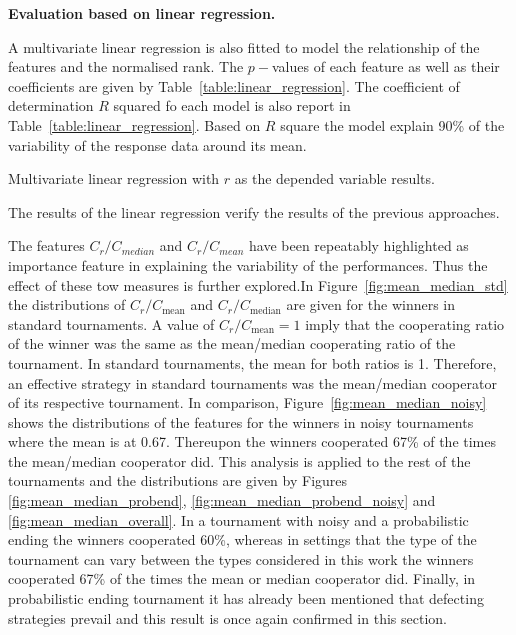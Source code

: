 \documentclass{article}
\begin{document}
\textbf{Evaluation based on linear regression.}

A multivariate linear regression is also fitted to model the relationship of the
features and the normalised rank. The \(p-\)values of each feature as well as
their coefficients are given by Table~\ref{table:linear_regression}. The
coefficient of determination \(R\) squared fo each model is also report in
Table~\ref{table:linear_regression}. Based on \(R\) square the model explain 90\% of
the variability of the response data around its mean.

\begin{table}[h]
    \begin{center}
\resizebox{.8\textwidth}{!}{
    }
    \end{center}
    \caption{Multivariate linear regression with \(r\) as the depended variable results.}
    \label{table:linear_regression}
\end{table}

The results of the linear regression verify the results of the previous approaches.

The features $C_{r} / C_{median}$ and $C_r / C_{mean}$ have been repeatably
highlighted as importance feature in explaining the variability of the performances.
Thus the effect of these tow measures is further explored.In
Figure~\ref{fig:mean_median_std} the distributions of \(C_r / C_{\text{mean}}\)
and \(C_r / C_{\text{median}}\) are given for the winners in standard tournaments. A value of \(C_r /
C_{\text{mean}} = 1\) imply that the cooperating ratio of the winner was the
same as the mean/median cooperating ratio of the tournament. In standard tournaments, the mean
for both ratios is 1. Therefore, an effective strategy in standard tournaments
was the mean/median cooperator of its respective tournament. In comparison,
Figure~\ref{fig:mean_median_noisy} shows the distributions of the features for
the winners in noisy tournaments where the mean is at 0.67. Thereupon the winners
cooperated 67\% of the times the mean/median cooperator did. This analysis is
applied to the rest of the tournaments and the distributions are given by
Figures \ref{fig:mean_median_probend}, \ref{fig:mean_median_probend_noisy} and
\ref{fig:mean_median_overall}. In a tournament with noisy and a probabilistic
ending the winners cooperated 60\%, whereas in settings that the type of the
tournament can vary between the types considered in this work the winners
cooperated 67\% of the times the mean or median cooperator did. Finally, in
probabilistic ending tournament it has already been mentioned that defecting
strategies prevail and this result is once again confirmed in this section.
\end{document}
